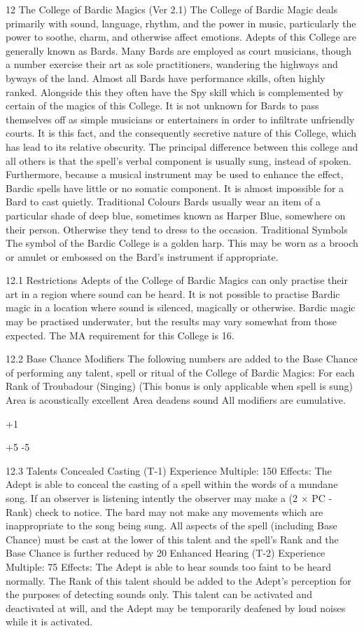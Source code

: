 \documentclass[a4paper]{article}
\begin{document}
\begin{multicols}{3}
12 The College of Bardic Magics (Ver 2.1)
The College of Bardic Magic deals primarily with
sound, language, rhythm, and the power in music,
particularly the power to soothe, charm, and otherwise affect emotions. Adepts of this College are
generally known as Bards. Many Bards are employed as court musicians, though a number exercise their art as sole practitioners, wandering the
highways and byways of the land.
Almost all Bards have performance skills, often
highly ranked. Alongside this they often have the
Spy skill which is complemented by certain of the
magics of this College. It is not unknown for Bards
to pass themselves off as simple musicians or
entertainers in order to infiltrate unfriendly courts.
It is this fact, and the consequently secretive nature
of this College, which has lead to its relative obscurity.
The principal difference between this college and
all others is that the spell’s verbal component is
usually sung, instead of spoken. Furthermore,
because a musical instrument may be used to enhance the effect, Bardic spells have little or no
somatic component. It is almost impossible for a
Bard to cast quietly.
Traditional Colours
Bards usually wear an item of a particular shade of
deep blue, sometimes known as Harper Blue,
somewhere on their person. Otherwise they tend to
dress to the occasion.
Traditional Symbols
The symbol of the Bardic College is a golden harp.
This may be worn as a brooch or amulet or embossed on the Bard’s instrument if appropriate.

12.1 Restrictions
Adepts of the College of Bardic Magics can only
practise their art in a region where sound can be
heard. It is not possible to practise Bardic magic in
a location where sound is silenced, magically or
otherwise. Bardic magic may be practised underwater, but the results may vary somewhat from
those expected.
The MA requirement for this College is 16.

12.2 Base Chance Modifiers
The following numbers are added to the Base
Chance of performing any talent, spell or ritual of
the College of Bardic Magics:
For each Rank of Troubadour (Singing)
(This bonus is only applicable when spell is
sung)
Area is acoustically excellent
Area deadens sound
All modifiers are cumulative.

+1

+5
-5

12.3 Talents
Concealed Casting (T-1)
Experience Multiple: 150
Effects: The Adept is able to conceal the casting of
a spell within the words of a mundane song. If an
observer is listening intently the observer may
make a (2 × PC - Rank) check to notice. The bard
may not make any movements which are inappropriate to the song being sung. All aspects of the
spell (including Base Chance) must be cast at the
lower of this talent and the spell’s Rank and the
Base Chance is further reduced by 20%
Enhanced Hearing (T-2)
Experience Multiple: 75
Effects: The Adept is able to hear sounds too faint
to be heard normally. The Rank of this talent
should be added to the Adept’s perception for the
purposes of detecting sounds only. This talent can
be activated and deactivated at will, and the Adept
may be temporarily deafened by loud noises while
it is activated.


\end{multicols}
\end{document}
